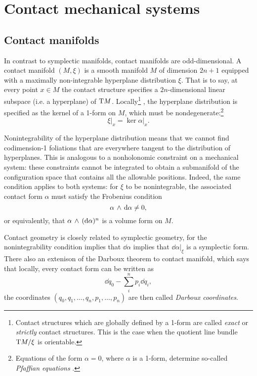 \section{Contact mechanical systems}
\label{sec:contact}

\subsection{Contact manifolds}
In contrast to symplectic manifolds, contact manifolds are odd-dimensional. A contact manifold $(M, \xi)$ is a smooth manifold $M$ of dimension $2n + 1$ equipped with a maximally non-integrable hyperplane distribution $\xi$. That is to say, at every point $x \in M$ the contact structure specifies a $2n$-dimensional linear subspace (i.e. a hyperplane) of $\mathrm{T}M$. Locally\footnote
{
    Contact structures which are globally defined by a 1-form are called \emph{exact} or \emph{strictly} contact structures. This is the case when the quotient line bundle $ \mathrm{T}M/\xi$ is orientable. 
}
, the hyperplane distribution is specified as the kernel of a 1-form on $M$, which must be nondegenerate:\footnote{Equations of the form $ \alpha = 0$, where $\alpha$ is a 1-form, determine so-called \emph{Pfaffian equations} \cite{Libermann1987}.} \cite{Geiges2008, Arnold1989, Cannas2001}
$$ \xi\vert_x = \ker{\alpha}\vert_x. $$

Nonintegrability of the hyperplane distribution means that we cannot find codimension-1 foliations that are everywhere tangent to the distribution of hyperplanes. This is analogous to a nonholonomic constraint on a mechanical system: these constraints cannot be integrated to obtain a submanifold of the configuration space that contains all the allowable positions. Indeed, the same condition applies to both systems: for $\xi$ to be nonintegrable, the associated contact form $\alpha$ must satisfy the Frobenius condition 
$$  \alpha\,\wedge\,\dd{\alpha}  \neq 0, $$
or equivalently, that $ \alpha\,\wedge\,(\dd{\alpha})^n $ is a volume form on $M$. 

Contact geometry is closely related to symplectic geometry, for the nonintegrability condition implies that $\dd{\alpha}$ implies that $\dd{\alpha}\vert_{\xi}$ is a symplectic form. There also an extenison of the Darboux theorem to contact manifold, which says that locally, every contact form can be written as
$$ \dd{q}_0 - \sum_i^n p_i \dd{q}_i, $$ 
the coordinates $(q_0, q_1, \ldots, q_n, p_1, \ldots, p_n)$ are then called \emph{Darboux coordinates}.

